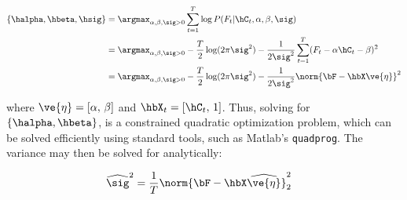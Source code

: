 \begin{align} 
\{\halpha, \hbeta, \hsig\} &= \argmax_{\alpha, \beta, \sig > 0} \sum_{t=1}^T \log P(F_t | \hC_t, \alpha, \beta, \sig) \nonumber \\
&=  \argmax_{\alpha, \beta, \sig > 0} -\frac{T}{2} \log (2 \pi \sig^2)  - \frac{1}{2\sig^2} \sum_{t=1}^T (F_t - \alpha \hC_{t} - \beta )^2 \nonumber \\
&=   \argmax_{\alpha, \beta, \sig > 0} -\frac{T}{2} \log (2 \pi \sig^2)  - \frac{1}{2\sig^2} \norm{\bF- \hbX \ve{\eta}}^2 \label{eq:lik2}
\end{align}

%
%
%
%

\noindent where  $\ve{\eta}=[\alpha, \, \beta]$  and $\hbX_t=[\hC_{t}, \, 1]$.  Thus, solving for $\{\halpha,\hbeta\}$, is a constrained quadratic optimization problem, which can be solved efficiently using standard tools, such as Matlab's \texttt{quadprog}.  The variance may then be solved for analytically:

\begin{align} 
\widehat{\sig}^2 &= \frac{1}{T} \norm{\bF - \hbX \widehat{\ve{\eta}}}_2^2 \label{eq:sig}
\end{align}

